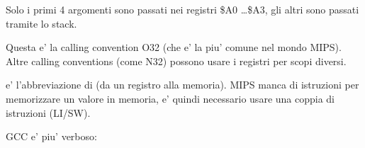 Solo i primi 4 argomenti sono passati nei registri \$A0 \dots \$A3, gli altri sono passati tramite lo stack.

Questa e' la calling convention O32 (che e' la piu' comune nel mondo MIPS).
Altre calling conventions (come N32) possono usare i registri per scopi diversi.


 e' l'abbreviazione di  (da un registro alla memoria).
MIPS manca di istruzioni per memorizzare un valore in memoria, e' quindi necessario usare una coppia di istruzioni (LI/SW).






\NonOptimizing GCC e' piu' verboso:




